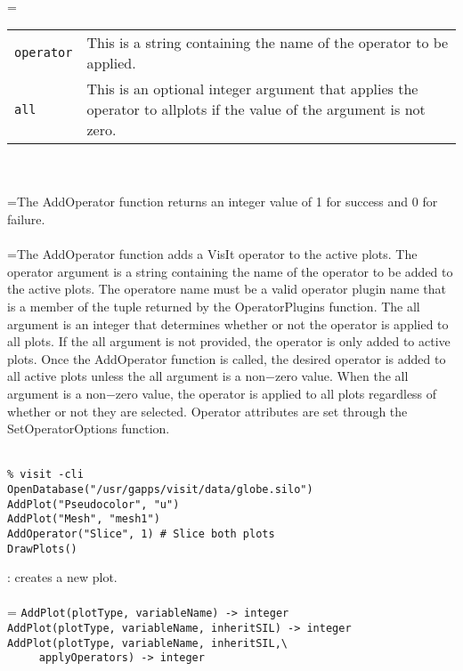 \documentclass[10pt,a4paper]{report}
\begin{document}
 \\ 
\hangindent=\parindent 
\begin{tabular}{lp{9cm}}
\verb!operator! & This is a string containing the name of the operator to be applied. \\
\verb!all! & This is an optional integer argument that applies the operator to allplots if the value of the argument is not zero. \\
\end{tabular} \\[-2mm]


 \\ 
\hangindent=\parindent The AddOperator function returns an integer value of 1 for success and 0 for failure. \\[-3mm] 

 \\ 
\hangindent=\parindent The AddOperator function adds a VisIt operator to the active plots. The operator argument is a string containing the name of the operator to be added to the active plots. The operatore name must be a valid operator plugin name that is a member of the tuple returned by the OperatorPlugins function. The all argument is an integer that determines whether or not the operator is applied to all plots. If the all argument is not provided, the operator is only added to active plots. Once the AddOperator function is called, the desired operator is added to all active plots unless the all argument is a non$-$zero value. When the all argument is a non$-$zero value, the operator is applied to all plots regardless of whether or not they are selected. Operator attributes are set through the SetOperatorOptions function. \\[-3mm] 

\\[-6mm]
\begin{verbatim}% visit -cli
OpenDatabase("/usr/gapps/visit/data/globe.silo")
AddPlot("Pseudocolor", "u")
AddPlot("Mesh", "mesh1")
AddOperator("Slice", 1) # Slice both plots
DrawPlots()
\end{verbatim}
\newpage


{}
: creates a new plot.\\[-3mm]

 \\ 
\hangindent=\parindent 
\verb!AddPlot(plotType, variableName) -> integer!\\ 
\verb!AddPlot(plotType, variableName, inheritSIL) -> integer!\\
\verb!AddPlot(plotType, variableName, inheritSIL,\ ! \\ 
\verb!     applyOperators) -> integer!\\ [-3mm]
\end{document}
